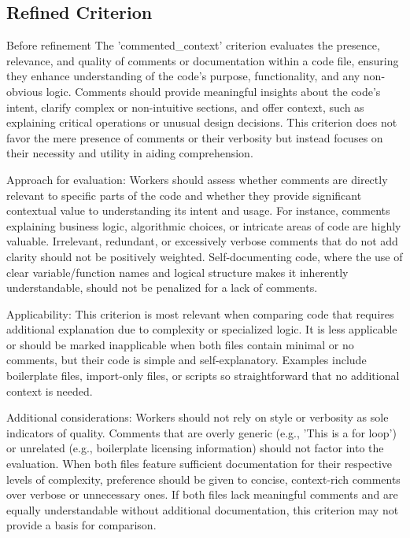 \subsection{Refined Criterion}
\begin{tcolorbox}
    [title = {Criterion \textbf{commented\_context}},breakable] Before refinement
    \tcblower \footnotesize The 'commented\_context' criterion evaluates the presence,
    relevance, and quality of comments or documentation within a code file,
    ensuring they enhance understanding of the code's purpose, functionality,
    and any non-obvious logic. Comments should provide meaningful insights about
    the code's intent, clarify complex or non-intuitive sections, and offer context,
    such as explaining critical operations or unusual design decisions. This criterion
    does not favor the mere presence of comments or their verbosity but instead focuses
    on their necessity and utility in aiding comprehension. \par Approach for
    evaluation: Workers should assess whether comments are directly relevant to specific
    parts of the code and whether they provide significant contextual value to understanding
    its intent and usage. For instance, comments explaining business logic,
    algorithmic choices, or intricate areas of code are highly valuable.
    Irrelevant, redundant, or excessively verbose comments that do not add
    clarity should not be positively weighted. Self-documenting code, where the
    use of clear variable/function names and logical structure makes it
    inherently understandable, should not be penalized for a lack of comments.
    \par Applicability: This criterion is most relevant when comparing code that
    requires additional explanation due to complexity or specialized logic. It
    is less applicable or should be marked inapplicable when both files contain
    minimal or no comments, but their code is simple and self-explanatory.
    Examples include boilerplate files, import-only files, or scripts so
    straightforward that no additional context is needed. \par Additional considerations:
    Workers should not rely on style or verbosity as sole indicators of quality.
    Comments that are overly generic (e.g., 'This is a for loop') or unrelated (e.g.,
    boilerplate licensing information) should not factor into the evaluation.
    When both files feature sufficient documentation for their respective levels
    of complexity, preference should be given to concise, context-rich comments
    over verbose or unnecessary ones. If both files lack meaningful comments and
    are equally understandable without additional documentation, this criterion
    may not provide a basis for comparison.
\end{tcolorbox}
